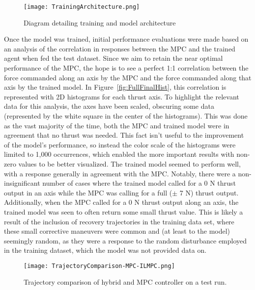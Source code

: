 \documentclass[twocolumn,letterpaper]{IEEEAerospaceCLS}
\begin{document}
\begin{figure}[ht]
    \centering
    \texttt{[image: TrainingArchitecture.png]}
    \caption{Diagram detailing training and model architecture}
    \label{fig:TrainingArchitecture}
\end{figure}

Once the model was trained, initial performance evaluations were made based on an analysis of the correlation in responses between the MPC and the trained agent when fed the test dataset. Since we aim to retain the near optimal performance of the MPC, the hope is to see a perfect 1:1 correlation between the force commanded along an axis by the MPC and the force commanded along that axis by the trained model. In Figure~\ref{fig:FullFinalHist}, this correlation is represented with 2D histograms for each thrust axis. To highlight the relevant data for this analysis, the axes have been scaled, obscuring some data (represented by the white square in the center of the histograms). This was done as the vast majority of the time, both the MPC and trained model were in agreement that no thrust was needed. This fact isn't useful to the improvement of the model's performance, so instead the color scale of the histograms were limited to 1,000 occurrences, which enabled the more important results with non-zero values to be better visualized. The trained model seemed to perform well, with a response generally in agreement with the MPC. Notably, there were a non-insignificant number of cases where the trained model called for a 0 N thrust output in an axis while the MPC was calling for a full ($\pm$ 7 N) thrust output. Additionally, when the MPC called for a 0 N thrust output along an axis, the trained model was seen to often return some small thrust value. This is likely a result of the inclusion of recovery trajectories in the training data set, where these small corrective maneuvers were common and (at least to the model) seemingly random, as they were a response to the random disturbance employed in the training dataset, which the model was not provided data on.

\begin{figure}[ht]
\centering
\texttt{[image: TrajectoryComparison-MPC-ILMPC.png]}
\caption{Trajectory comparison of hybrid and MPC controller on a test run.}
\label{fig:FreeViewTrajectories}
\end{figure}
\end{document}
